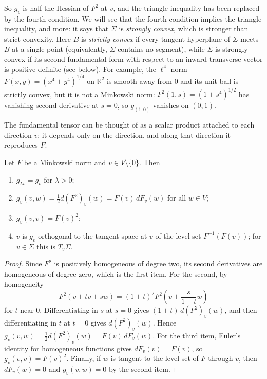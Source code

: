 \noindent
So $g_v$ is half the Hessian of $F^2$ at
$v$, and the triangle inequality has been
replaced by the fourth condition. We will
see that the fourth condition implies the
triangle inequality, and more: it says that
$\Sigma$ is \emph{strongly convex}, which is
stronger than strict convexity. Here $B$ is
\emph{strictly convex} if every tangent
hyperplane of $\Sigma$ meets $B$ at a single
point (equivalently, $\Sigma$ contains no
segment), while $\Sigma$ is strongly convex
if its second fundamental form with respect
to an inward transverse vector is positive
definite (see below). For example, the
$\ell^4$ norm
$F(x,y) = (x^4 + y^4)^{1/4}$ on
$\mathbb{R}^2$ is smooth away from $0$ and
its unit ball is strictly convex, but it is
not a Minkowski norm:
$F^2(1,s) = (1 + s^4)^{1/2}$ has vanishing
second derivative at $s = 0$, so
$g_{(1,0)}$ vanishes on $(0,1)$.

The fundamental tensor can be thought of as
a scalar product attached to each direction
$v$; it depends only on the direction, and
along that direction it reproduces $F$.

\begin{proposition}
\label{proposition-javaloyes-fund-tensor}
Let $F$ be a Minkowski norm and
$v \in V \setminus \{0\}$. Then
\begin{enumerate}
\item $g_{\lambda v} = g_v$ for
$\lambda > 0$;
\item $g_v(v,w) = \frac{1}{2} d(F^2)_v(w)
= F(v)\, dF_v(w)$ for all $w \in V$;
\item $g_v(v,v) = F(v)^2$;
\item $v$ is $g_v$-orthogonal to the tangent
space at $v$ of the level set
$F^{-1}(F(v))$; for $v \in \Sigma$ this is
$T_v\Sigma$.
\end{enumerate}
\end{proposition}

\begin{proof}
Since $F^2$ is positively homogeneous of
degree two, its second derivatives are
homogeneous of degree zero, which is the
first item. For the second, by homogeneity
$$
F^2(v + tv + sw) = (1+t)^2
F^2\left(v + \frac{s}{1+t} w\right)
$$
for $t$ near $0$. Differentiating in $s$ at
$s = 0$ gives
$(1 + t)\, d(F^2)_v(w)$, and then
differentiating in $t$ at $t = 0$ gives
$d(F^2)_v(w)$. Hence
$g_v(v,w) = \frac{1}{2} d(F^2)_v(w)
= F(v)\, dF_v(w)$. For the third item,
Euler's identity for homogeneous functions
gives $dF_v(v) = F(v)$, so
$g_v(v,v) = F(v)^2$. Finally, if $w$ is
tangent to the level set of $F$ through
$v$, then $dF_v(w) = 0$ and
$g_v(v,w) = 0$ by the second item.
\end{proof}

